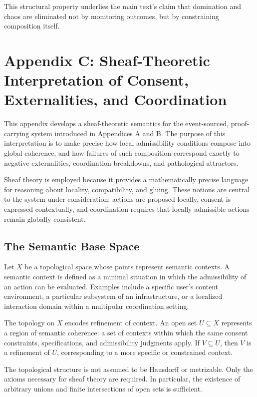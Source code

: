 \documentclass[11pt,oneside]{article}
\begin{document}
This structural property underlies the main text’s claim that domination and chaos are eliminated not by monitoring outcomes, but by constraining composition itself.

\section{Appendix C: Sheaf-Theoretic Interpretation of Consent, Externalities, and Coordination}

This appendix develops a sheaf-theoretic semantics for the event-sourced, proof-carrying system introduced in Appendices A and B. The purpose of this interpretation is to make precise how local admissibility conditions compose into global coherence, and how failures of such composition correspond exactly to negative externalities, coordination breakdowns, and pathological attractors.

Sheaf theory is employed because it provides a mathematically precise language for reasoning about locality, compatibility, and gluing. These notions are central to the system under consideration: actions are proposed locally, consent is expressed contextually, and coordination requires that locally admissible actions remain globally consistent.

\subsection{The Semantic Base Space}

Let \( X \) be a topological space whose points represent semantic contexts. A semantic context is defined as a minimal situation in which the admissibility of an action can be evaluated. Examples include a specific user’s content environment, a particular subsystem of an infrastructure, or a localized interaction domain within a multipolar coordination setting.

The topology on \( X \) encodes refinement of context. An open set \( U \subseteq X \) represents a region of semantic coherence: a set of contexts within which the same consent constraints, specifications, and admissibility judgments apply. If \( V \subseteq U \), then \( V \) is a refinement of \( U \), corresponding to a more specific or constrained context.

The topological structure is not assumed to be Hausdorff or metrizable. Only the axioms necessary for sheaf theory are required. In particular, the existence of arbitrary unions and finite intersections of open sets is sufficient.
\end{document}
